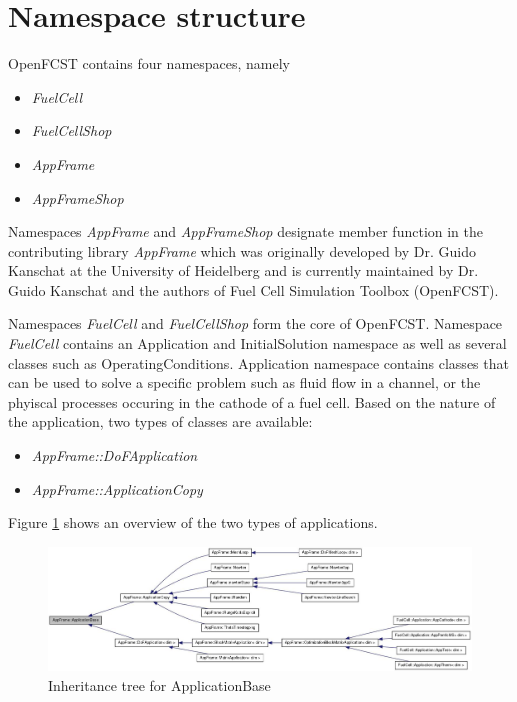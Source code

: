 \section{Namespace structure}

OpenFCST contains four namespaces, namely
\begin{itemize}
 \item \textit{FuelCell}
 \item \textit{FuelCellShop}
 \item \textit{AppFrame}
 \item \textit{AppFrameShop}
\end{itemize}

Namespaces \textit{AppFrame} and \textit{AppFrameShop} designate member function in the contributing library \textit{AppFrame} which was originally developed by Dr. Guido Kanschat at the University of Heidelberg and is currently maintained by Dr. Guido Kanschat and the authors of Fuel Cell Simulation Toolbox (OpenFCST).

Namespaces \textit{FuelCell} and \textit{FuelCellShop} form the core of OpenFCST. Namespace \textit{FuelCell} contains an Application and InitialSolution namespace as well as several classes such as OperatingConditions. Application namespace contains classes that can be used to solve a specific problem such as fluid flow in a channel, or the phyiscal processes occuring in the cathode of a fuel cell. Based on the nature of the application, two types of classes are available:
\begin{itemize}
 \item \textit{AppFrame::DoFApplication}
 \item \textit{AppFrame::ApplicationCopy}
\end{itemize}
Figure \ref{fig:AppBase_Tree} shows an overview of the two types of applications. 

\begin{figure}[btp]
\begin{center} 
\includegraphics[width=\textwidth]{./figures/classAppFrame_ApplicationBase__inherit__graph.jpg}
\caption{Inheritance tree for ApplicationBase}
\label{fig:AppBase_Tree}
\end{center}
\end{figure}

